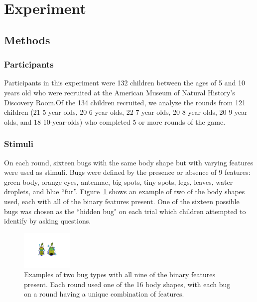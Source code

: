 \documentclass[10pt,letterpaper]{article}
\begin{document}
\section{Experiment}


\subsection{Methods}

\subsubsection{Participants}

Participants in this experiment were 132 children between the ages of 5 and 10 
years old who were recruited at the American Museum of Natural History's 
Discovery Room.Of the 134 children recruited, we analyze the rounds from 121 
children (21 5-year-olds, 20 6-year-olds, 22 7-year-olds, 20 8-year-olds, 20 9-year-olds, 
and 18 10-year-olds) who completed 5 or more rounds of the game.

\subsubsection{Stimuli}

On each round, sixteen bugs with the same body shape but with varying features were used as stimuli. Bugs were defined by the presence or absence of 9 features: green body, 
orange eyes, antennae, big spots, tiny spots, legs, leaves, water droplets, and blue 
``fur''. Figure~\ref{fig:example_bugs} shows an example of two of the body shapes used, each with all of the binary features present. One of the sixteen possible bugs was chosen as the ``hidden bug" on each trial which 
children attempted to identify by asking questions.


\begin{figure}[h]
  \centering
  \includegraphics[width=0.22\textwidth]{figures/example_bugs}
  \caption{Examples of two bug types with all nine of the binary features present. Each round used one of the 16 
body shapes, with each bug on a round having a unique combination of features.}
  \label{fig:example_bugs}
\end{figure} 
\end{document}
